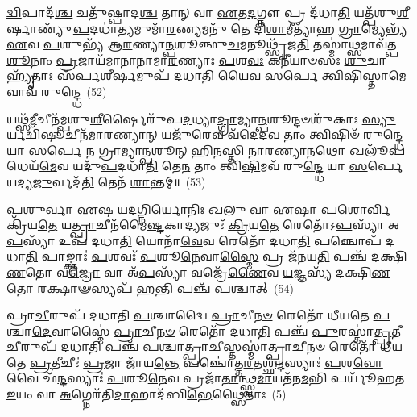 \-\ul{𑌦𑍍𑌵𑌿}\-𑌪𑌾𑌦᳴\-\ul{𑌶𑍍𑌚} 𑌚𑌤𑍁᳴𑌷𑍍𑌪𑌾𑌦\-\ul{𑌶𑍍𑌚} 𑌤𑌾𑌨𑍍 𑌵𑌾 \ul{𑌏}\-𑌤\-\ul{𑌦}\-𑌗𑍍𑌨𑍗 𑌪𑍍𑌰 𑌦᳴𑌧𑌾\-\ul{𑌤𑌿} 𑌯𑌤𑍍𑌪᳴𑌶𑍁\-\ul{𑌶𑍀}\-𑌰𑍍\mbox{}𑌷𑌾𑌣𑍍𑌯𑍁᳴\-\ul{𑌪}\-𑌦𑌧𑌾॑\-\ul{𑌤𑍍𑌯}\-𑌮𑍁𑌮𑌾᳴\-\ul{𑌰}\-𑌣𑍍𑌯𑌮𑌨𑍁᳴ 𑌤𑍇 𑌦𑌿\-\ul{𑌶𑌾}\-𑌮𑍀𑌤𑍍𑌯𑌾᳴𑌹 \ul{𑌗𑍍𑌰𑌾}\-𑌮𑍍𑌯𑍇𑌭𑍍𑌯᳴ \ul{𑌏}\-𑌵 \ul{𑌪}\-𑌶𑍁𑌭𑍍𑌯᳴ 𑌆\-\ul{𑌰}\-𑌣𑍍𑌯𑌾\-\ul{𑌨𑍍𑌪}\-𑌶𑍂𑌞𑍍𑌛𑍁\-\ul{𑌚}\-𑌮𑌨𑍂𑌥𑍍𑌸𑍃᳴𑌜\-\ul{𑌤𑌿} 𑌤𑌸𑍍𑌮𑌾॑\-\ul{𑌥𑍍𑌸}\-𑌮𑌾𑌵᳴𑌤𑍍𑌪\-\ul{𑌶𑍂}\-𑌨𑌾𑌂 \ul{𑌪𑍍𑌰}\-𑌜𑌾𑌯᳴𑌮𑌾𑌨𑌾𑌨𑌾𑌮𑌾\-\ul{𑌰}\-𑌣𑍍𑌯𑌾𑌃 \ul{𑌪}\-𑌶\-\ul{𑌵𑌃} 𑌕𑌨𑍀᳴𑌯𑌾𑍞𑌸𑌃 \ul{𑌶𑍁}\-𑌚𑌾 𑌹𑍍𑌯𑍃᳴𑌤𑌾𑌃 𑌸᳴𑌰𑍍𑌪\-\ul{𑌶𑍀}\-𑌰𑍍\mbox{}𑌷𑌮𑍁𑌪᳴ 𑌦𑌧𑌾\-\ul{𑌤𑌿} 𑌯𑍈𑌵 \ul{𑌸}\-𑌰𑍍𑌪𑍇 𑌤𑍍𑌵𑌿\-\ul{𑌷𑌿}\-𑌸𑍍𑌤𑌾\-\ul{𑌮𑍇}\-𑌵𑌾𑌵᳴ 𑌰𑍁𑌨𑍍𑌦𑍍𑌧𑍇~(52)

𑌯𑌥𑍍𑌸᳴\-\ul{𑌮𑍀}\-𑌚𑍀𑌨᳴𑌮𑍍𑌪𑌶𑍁\-\ul{𑌶𑍀}\-𑌰𑍍\mbox{}𑌷𑍈𑌰𑍁᳴𑌪\-\ul{𑌦}\-𑌧𑍍𑌯𑌾\-\ul{𑌦𑍍𑌗𑍍𑌰𑌾}\-𑌮𑍍𑌯𑌾\-\ul{𑌨𑍍𑌪}\-𑌶𑍂𑌨𑍍𑌦𑍞𑌶𑍁᳴𑌕𑌾𑌃 \ul{𑌸𑍍𑌯𑍁}\-𑌰𑍍𑌯𑌦𑍍𑌵𑌿᳴\-\ul{𑌷𑍂}\-𑌚𑍀𑌨᳴𑌮𑌾\-\ul{𑌰}\-𑌣𑍍𑌯𑌾𑌨𑍍 𑌯𑌜𑍁᳴\-\ul{𑌰𑍇}\-𑌵 𑌵᳴\-\ul{𑌦𑍇}\-𑌦\-\ul{𑌵} 𑌤𑌾𑌂 𑌤𑍍𑌵𑌿𑌷𑌿𑍞᳴ 𑌰𑍁\-\ul{𑌨𑍍𑌦𑍍𑌧𑍇} 𑌯𑌾 \ul{𑌸}\-𑌰𑍍𑌪𑍇 𑌨 \ul{𑌗𑍍𑌰𑌾}\-𑌮𑍍𑌯𑌾\-\ul{𑌨𑍍𑌪}\-𑌶𑍂𑌨𑍍 \ul{𑌹𑌿}\-𑌨\-\ul{𑌸𑍍𑌤𑌿} 𑌨𑌾\-\ul{𑌰}\-𑌣𑍍𑌯𑌾𑌨\-\ul{𑌥𑍋} 𑌖𑌲𑍂᳴\-\ul{𑌪}\-𑌧𑍇𑌯᳴\-\ul{𑌮𑍇}\-𑌵 𑌯𑌦𑍁᳴\-\ul{𑌪}\-𑌦𑌧𑌾᳴\-\ul{𑌤𑌿} 𑌤𑍇\-\ul{𑌨} 𑌤𑌾𑌂 𑌤𑍍𑌵𑌿\-\ul{𑌷𑌿}\-𑌮𑌵᳴ 𑌰𑍁\-\ul{𑌨𑍍𑌦𑍍𑌧𑍇} 𑌯𑌾 \ul{𑌸}\-𑌰𑍍𑌪𑍇 𑌯𑌦𑍍𑌯\-\ul{𑌜𑍁}\-𑌰𑍍𑌵𑌦᳴\-\ul{𑌤𑌿} 𑌤𑍇𑌨᳴ \ul{𑌶𑌾}\-𑌨𑍍𑌤𑌮𑍍॥~(53)

{\anuvakamend[{\-\ul{𑌊}\-𑌨𑌾𑌨𑍍𑌤𑌸𑍍𑌯𑍋𑌪᳴ \ul{𑌪𑍍𑌰𑌾}\-𑌣𑌾𑌃 \ul{𑌸𑍍𑌯𑌾}\-𑌦𑌿\-\ul{𑌤𑌿} 𑌵𑍈 \ul{𑌪}\-𑌶𑌵𑍋᳴ 𑌰𑍁\-\ul{𑌨𑍍𑌧𑍇} 𑌚𑌤𑍁᳴𑌶𑍍𑌚𑌤𑍍𑌵𑌾𑌰𑌿𑍞𑌶𑌚𑍍𑌚}]}%

\-\ul{𑌪}\-𑌶𑍁𑌰𑍍𑌵𑌾 \ul{𑌏}\-𑌷 𑌯\-\ul{𑌦}\-𑌗𑍍𑌨𑌿𑌰𑍍𑌯𑍋\-\ul{𑌨𑌿𑌃} 𑌖\-\ul{𑌲𑍁} 𑌵𑌾 \ul{𑌏}\-𑌷𑌾 \ul{𑌪}\-𑌶𑍋𑌰𑍍𑌵𑌿 𑌕𑍍𑌰𑌿᳴𑌯\-\ul{𑌤𑍇} 𑌯\-\ul{𑌤𑍍𑌪𑍍𑌰𑌾}\-𑌚𑍀𑌨᳴𑌮𑍈\-\ul{𑌷𑍍𑌟}\-𑌕𑌾𑌦𑍍𑌯𑌜𑍁𑌃᳴ \ul{𑌕𑍍𑌰𑌿}\-𑌯\-\ul{𑌤𑍇} 𑌰𑍇𑌤𑍋᳴\-𑌽\-\ul{𑌪}\-𑌸𑍍𑌯𑌾᳴ 𑌅\-\ul{𑌪}\-𑌸𑍍𑌯𑌾᳴ 𑌉𑌪᳴ 𑌦𑌧𑌾\-\ul{𑌤𑌿} 𑌯𑍋𑌨𑌾᳴\-\ul{𑌵𑍇}\-𑌵 𑌰𑍇𑌤𑍋᳴ 𑌦𑌧𑌾\-\ul{𑌤𑌿} 𑌪𑌞𑍍𑌚𑍋𑌪᳴ 𑌦𑌧𑌾\-\ul{𑌤𑌿} 𑌪𑌾𑌙𑍍𑌕𑍍𑌤𑌾𑌃॑ \ul{𑌪}\-𑌶𑌵𑌃᳴ \ul{𑌪}\-𑌶𑍂\-\ul{𑌨𑍇}\-𑌵𑌾\-\ul{𑌸𑍍𑌮𑍈} 𑌪𑍍𑌰 𑌜᳴𑌨𑌯\-\ul{𑌤𑌿} 𑌪𑌞𑍍𑌚᳴ 𑌦𑌕𑍍𑌷𑌿\-\ul{𑌣}\-𑌤𑍋 𑌵\-\ul{𑌜𑍍𑌰𑍋} 𑌵𑌾 𑌅᳴\-\ul{𑌪}\-𑌸𑍍𑌯𑌾᳴ 𑌵𑌜𑍍𑌰𑍇᳴\-\ul{𑌣𑍈}\-𑌵 \ul{𑌯}\-𑌜𑍍𑌞𑌸𑍍𑌯᳴ 𑌦𑌕𑍍𑌷𑌿\-\ul{𑌣}\-𑌤𑍋 𑌰\-\ul{𑌕𑍍𑌷𑌾}\-\-\ul{𑍟}\-𑌸𑍍𑌯𑌪᳴ 𑌹\-\ul{𑌨𑍍𑌤𑌿} 𑌪𑌞𑍍𑌚᳴ \ul{𑌪}\-𑌶𑍍𑌚𑌾𑌤𑍍~(54)

𑌪𑍍𑌰𑌾\-\ul{𑌚𑍀}\-𑌰𑍁𑌪᳴ 𑌦𑌧𑌾𑌤𑌿 \ul{𑌪}\-𑌶𑍍𑌚𑌾𑌦𑍍𑌵𑍈 \ul{𑌪𑍍𑌰𑌾}\-𑌚𑍀\-\ul{𑌨}\-\-\ul{𑍞} 𑌰𑍇𑌤𑍋᳴ 𑌧𑍀𑌯𑌤𑍇 \ul{𑌪}\-𑌶𑍍𑌚𑌾\-\ul{𑌦𑍇}\-𑌵𑌾𑌸𑍍𑌮𑍈॑ \ul{𑌪𑍍𑌰𑌾}\-𑌚𑍀\-\ul{𑌨}\-\-\ul{𑍞} 𑌰𑍇𑌤𑍋᳴ 𑌦𑌧𑌾\-\ul{𑌤𑌿} 𑌪𑌞𑍍𑌚᳴ \ul{𑌪𑍁}\-𑌰𑌸𑍍𑌤𑌾॑\-\ul{𑌤𑍍𑌪𑍍𑌰}\-𑌤𑍀\-\ul{𑌚𑍀}\-𑌰𑍁𑌪᳴ 𑌦𑌧𑌾\-\ul{𑌤𑌿} 𑌪𑌞𑍍𑌚᳴ \ul{𑌪}\-𑌶𑍍𑌚𑌾𑌤𑍍𑌪𑍍𑌰𑌾\-\ul{𑌚𑍀}\-𑌸𑍍𑌤𑌸𑍍𑌮𑌾॑\-\ul{𑌤𑍍𑌪𑍍𑌰𑌾}\-𑌚𑍀\-\ul{𑌨}\-\-\ul{𑍞} 𑌰𑍇𑌤𑍋᳴ 𑌧𑍀𑌯𑌤𑍇 \ul{𑌪𑍍𑌰}\-𑌤𑍀𑌚𑍀𑌃॑ \ul{𑌪𑍍𑌰}\-𑌜𑌾 𑌜𑌾᳴𑌯\-\ul{𑌨𑍍𑌤𑍇} 𑌪𑌞𑍍𑌚𑍋॑𑌤𑍍𑌤\-\ul{𑌰}\-𑌤𑌶𑍍𑌛᳴\-\ul{𑌨𑍍𑌦}\-𑌸𑍍𑌯𑌾𑌃॑ \ul{𑌪}\-𑌶\-\ul{𑌵𑍋} 𑌵𑍈 𑌛᳴\-\ul{𑌨𑍍𑌦}\-𑌸𑍍𑌯𑌾𑌃॑ \ul{𑌪}\-𑌶𑍂\-\ul{𑌨𑍇}\-𑌵 𑌪𑍍𑌰𑌜𑌾᳴\-\ul{𑌤𑌾}\-𑌨𑍍𑌥𑍍𑌸𑍍𑌵\-\ul{𑌮𑌾}\-𑌯𑌤᳴𑌨\-\ul{𑌮}\-𑌭𑌿 𑌪𑌰𑍍𑌯𑍂᳴𑌹𑌤 \ul{𑌇}\-𑌯𑌂 𑌵𑌾 \ul{𑌅}\-𑌗𑍍𑌨𑍇𑌰᳴𑌤𑌿\-\ul{𑌦𑌾}\-𑌹𑌾𑌦᳴𑌬𑌿\-\ul{𑌭𑍇}\-𑌥𑍍𑌸𑍈𑌤𑌾𑌃~(5)

